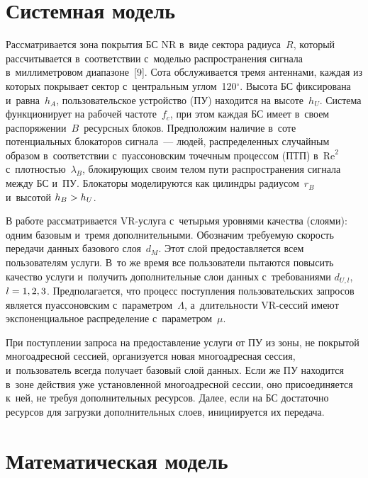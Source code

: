 \begin{multicols}{2}
\vspace*{-6pt}

\section{Системная модель}

\vspace*{-2pt}
  
  Рассматривается зона покрытия БС NR в~виде сектора радиуса~$R$, который 
рассчитывается в~соответствии с~моделью распространения сигнала 
в~миллиметровом диапазоне~[9]. Сота обслуживается тремя антеннами, каждая 
из которых покрывает сектор с~центральным углом~120$^\circ$. Высота БС 
фиксирована и~равна~$h_A$, пользовательское устройство (ПУ) находится на 
высоте~$h_U$. Система функционирует на рабочей частоте~$f_c$, при этом 
каждая БС имеет в~своем распоряжении~$B$~ресурсных блоков. Предположим 
наличие в~соте потенциальных блокаторов сигнала~--- людей, распределенных 
случайным образом в~соответствии с~пуассоновским точечным процессом 
(ПТП) в~$\mathrm{Re}^2$ с~плот\-ностью~$\lambda_B$, блокирующих своим телом пути 
распространения  сигнала между БС и~ПУ. Блокаторы моделируются как 
цилиндры радиусом~$r_B$ и~высотой $h_B\hm > h_U$. 
  
  В работе рассматривается VR-услу\-га с~четырьмя уровнями качества 
(слоями): одним базовым и~тремя дополнительными. Обозначим требуемую 
скорость передачи данных базового слоя~$d_M$. Этот слой предоставляется 
всем пользователям услуги. В~то же время все пользователи пытаются 
повысить качество услуги и~получить дополнительные слои данных 
с~требованиями $d_{U,l}$, $l\hm=1,2,3$. Предполагается, что процесс 
поступления пользовательских запросов является пуассоновским  
с~па\-ра\-мет\-ром~$\Lambda$, а~длительности VR-сес\-сий имеют 
экспоненциальное распределение с~па\-ра\-мет\-ром~$\mu$.
 
 При поступлении запроса на предоставление услуги от ПУ из зоны, не 
покрытой многоадресной сессией, организуется новая многоадресная сессия, 
и~пользователь всегда получает базовый слой данных. Если же ПУ находится 
в~зоне действия уже установленной многоадресной сессии, оно присоединяется 
к~ней, не требуя дополнительных ресурсов. Далее, если на БС достаточно 
ресурсов для загрузки дополнительных слоев, инициируется их передача.

\vspace*{-6pt}

\section{Математическая модель}


\end{multicols}
